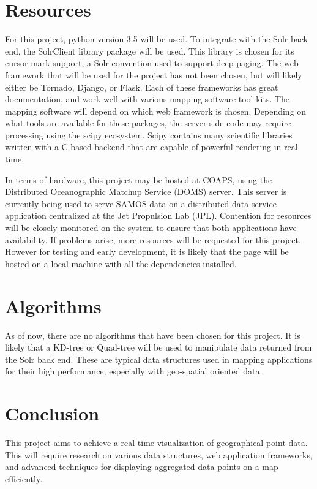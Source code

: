 \documentclass{acm_proc_article-sp}
\begin{document}
\section{Resources}
For this project, python version 3.5 will be used. To integrate with the Solr back end, the SolrClient library package will be used. This library is chosen for its cursor mark support, a Solr convention used to support deep paging. The web framework that will be used for the project has not been chosen, but will likely either be Tornado, Django, or Flask. Each of these frameworks has great documentation, and work well with various mapping software tool-kits. The mapping software will depend on which web framework is chosen. Depending on what tools are available for these packages, the server side code may require processing using the scipy ecosystem. Scipy contains many scientific libraries written with a C based backend that are capable of powerful rendering in real time.

In terms of hardware, this project may be hosted at COAPS, using the Distributed Oceanographic Matchup Service (DOMS) server. This server is currently being used to serve SAMOS data on a distributed data service application centralized at the Jet Propulsion Lab (JPL). Contention for resources will be closely monitored on the system to ensure that both applications have availability. If problems arise, more resources will be requested for this project. However for testing and early development, it is likely that the page will be hosted on a local machine with all the dependencies installed.


\section{Algorithms}
As of now, there are no algorithms that have been chosen for this project. It is likely that a KD-tree or Quad-tree will be used to manipulate data returned from the Solr back end. These are typical data structures used in mapping applications for their high performance, especially with geo-spatial oriented data.

\section{Conclusion}
This project aims to achieve a real time visualization of geographical point data. This will require research on various data structures, web application frameworks, and advanced techniques for displaying aggregated data points on a map efficiently.


\end{document}
